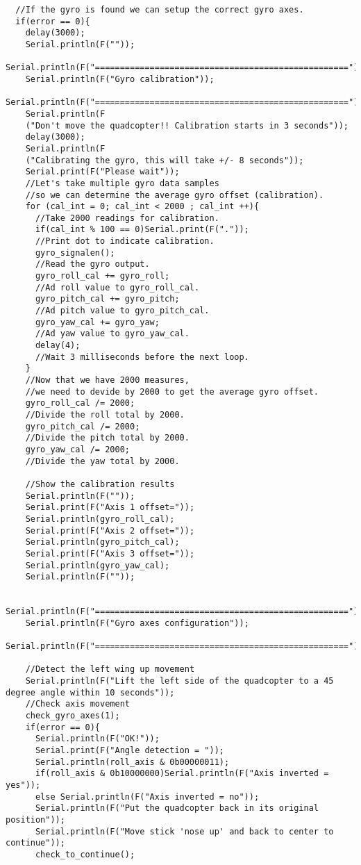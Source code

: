\begin{lstlisting}
  //If the gyro is found we can setup the correct gyro axes.
  if(error == 0){
    delay(3000);
    Serial.println(F(""));
    Serial.println(F("==================================================="));
    Serial.println(F("Gyro calibration"));
    Serial.println(F("==================================================="));
    Serial.println(F
    ("Don't move the quadcopter!! Calibration starts in 3 seconds"));
    delay(3000);
    Serial.println(F
    ("Calibrating the gyro, this will take +/- 8 seconds"));
    Serial.print(F("Please wait"));
    //Let's take multiple gyro data samples 
    //so we can determine the average gyro offset (calibration).
    for (cal_int = 0; cal_int < 2000 ; cal_int ++){  
      //Take 2000 readings for calibration.
      if(cal_int % 100 == 0)Serial.print(F("."));    
      //Print dot to indicate calibration.
      gyro_signalen();                                           
      //Read the gyro output.
      gyro_roll_cal += gyro_roll;                                
      //Ad roll value to gyro_roll_cal.
      gyro_pitch_cal += gyro_pitch;                              
      //Ad pitch value to gyro_pitch_cal.
      gyro_yaw_cal += gyro_yaw;                                  
      //Ad yaw value to gyro_yaw_cal.
      delay(4);                                                  
      //Wait 3 milliseconds before the next loop.
    }
    //Now that we have 2000 measures, 
    //we need to devide by 2000 to get the average gyro offset.
    gyro_roll_cal /= 2000;                                       
    //Divide the roll total by 2000.
    gyro_pitch_cal /= 2000;                                      
    //Divide the pitch total by 2000.
    gyro_yaw_cal /= 2000;                                        
    //Divide the yaw total by 2000.
    
    //Show the calibration results
    Serial.println(F(""));
    Serial.print(F("Axis 1 offset="));
    Serial.println(gyro_roll_cal);
    Serial.print(F("Axis 2 offset="));
    Serial.println(gyro_pitch_cal);
    Serial.print(F("Axis 3 offset="));
    Serial.println(gyro_yaw_cal);
    Serial.println(F(""));
    
    Serial.println(F("==================================================="));
    Serial.println(F("Gyro axes configuration"));
    Serial.println(F("==================================================="));
    
    //Detect the left wing up movement
    Serial.println(F("Lift the left side of the quadcopter to a 45 degree angle within 10 seconds"));
    //Check axis movement
    check_gyro_axes(1);
    if(error == 0){
      Serial.println(F("OK!"));
      Serial.print(F("Angle detection = "));
      Serial.println(roll_axis & 0b00000011);
      if(roll_axis & 0b10000000)Serial.println(F("Axis inverted = yes"));
      else Serial.println(F("Axis inverted = no"));
      Serial.println(F("Put the quadcopter back in its original position"));
      Serial.println(F("Move stick 'nose up' and back to center to continue"));
      check_to_continue();


\end{lstlisting}
